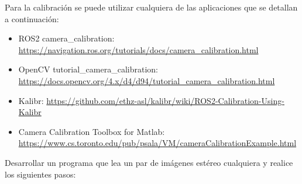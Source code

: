 \documentclass[tp]{lcc}
\begin{document}
\begin{nota}
    Para la calibración se puede utilizar cualquiera de las aplicaciones que se detallan a continuación:
    \begin{itemize}
        \item ROS2 camera\_calibration:  \url{https://navigation.ros.org/tutorials/docs/camera_calibration.html}
        \item OpenCV tutorial\_camera\_calibration:\\ \url{https://docs.opencv.org/4.x/d4/d94/tutorial_camera_calibration.html}
        \item Kalibr: \url{https://github.com/ethz-asl/kalibr/wiki/ROS2-Calibration-Using-Kalibr}
        \item Camera Calibration Toolbox for Matlab:\\ \url{https://www.cs.toronto.edu/pub/psala/VM/cameraCalibrationExample.html}
    \end{itemize}
\end{nota}

\ejercicio Desarrollar un programa que lea un par de imágenes estéreo cualquiera y realice los siguientes pasos:
\end{document}
